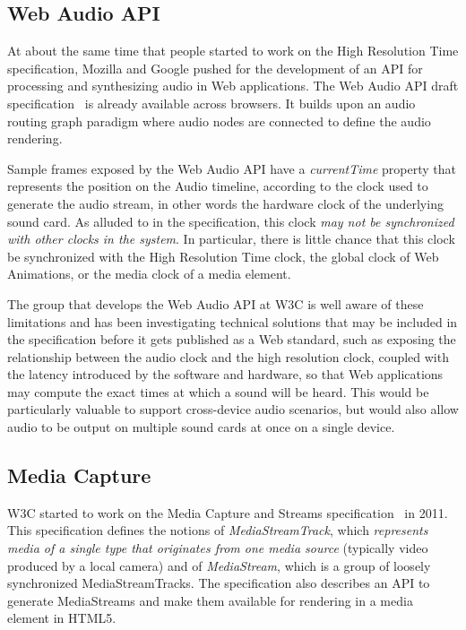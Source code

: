 \subsection{Web Audio API}
\label{sec:webaudio}

At about the same time that people started to work on the High Resolution Time
specification, Mozilla and Google pushed for the development of an API for
processing and synthesizing audio in Web applications. The Web Audio API draft
specification~\cite{webaudio} is already available across browsers. It builds upon an
audio routing graph paradigm where audio nodes are connected to define the
audio rendering.

Sample frames exposed by the Web Audio API have a \emph{currentTime} property that
represents the position on the Audio timeline, according to the clock used to
generate the audio stream, in other words the hardware clock of the underlying
sound card. As alluded to in the specification, this clock \emph{may not be
synchronized with other clocks in the system}. In particular, there is little
chance that this clock be synchronized with the High Resolution Time clock,
the global clock of Web Animations, or the media clock of a media element.

The group that develops the Web Audio API at W3C is well aware of these
limitations and has been investigating technical solutions that may be
included in the specification before it gets published as a Web standard, such
as exposing the relationship between the audio clock and the high resolution
clock, coupled with the latency introduced by the software and hardware, so
that Web applications may compute the exact times at which a sound will be
heard. This would be particularly valuable to support cross-device audio
scenarios, but would also allow audio to be output on multiple sound cards at
once on a single device.


\subsection{Media Capture}
\label{sec:capture}

W3C started to work on the Media Capture and Streams
specification~\cite{capture} in 2011. This specification defines the notions
of \emph{MediaStreamTrack}, which \emph{represents media of a single type that
originates from one media source} (typically video produced by a local camera)
and of \emph{MediaStream}, which is a group of loosely synchronized
MediaStreamTracks. The specification also describes an API to generate
MediaStreams and make them available for rendering in a media element in
HTML5.

